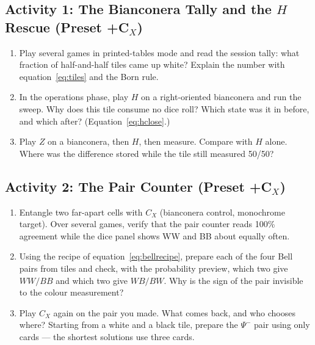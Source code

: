 \documentclass[a4paper,11pt]{article}
\begin{document}
\subsection{Activity 1: The Bianconera Tally and the \texorpdfstring{$H$}{H} Rescue (Preset \texorpdfstring{+C$_X$}{+CX})}

\begin{studentbox}
\begin{enumerate}
    \item Play several games in printed-tables mode and read the session tally: what
          fraction of half-and-half tiles came up white? Explain the number with
          equation~\eqref{eq:tiles} and the Born rule.
    \item In the operations phase, play $H$ on a right-oriented bianconera and run the
          sweep. Why does this tile consume no dice roll? Which state was it in before,
          and which after? (Equation~\eqref{eq:hclose}.)
    \item Play $Z$ on a bianconera, then $H$, then measure. Compare with $H$ alone.
          Where was the difference stored while the tile still measured 50/50?
\end{enumerate}
\end{studentbox}

\subsection{Activity 2: The Pair Counter (Preset \texorpdfstring{+C$_X$}{+CX})}

\begin{studentbox}
\begin{enumerate}
    \item Entangle two far-apart cells with $C_X$ (bianconera control, monochrome
          target). Over several games, verify that the pair counter reads 100\%
          agreement while the dice panel shows WW and BB about equally often.
    \item Using the recipe of equation~\eqref{eq:bellrecipe}, prepare each of the four
          Bell pairs from tiles and check, with the probability preview, which two give
          $WW/BB$ and which two give $WB/BW$. Why is the sign of the pair invisible to
          the colour measurement?
    \item Play $C_X$ again on the pair you made. What comes back, and who chooses where?
          Starting from a white and a black tile, prepare the $\Psi^-$ pair using only
          cards --- the shortest solutions use three cards.
\end{enumerate}
\end{studentbox}
\end{document}
